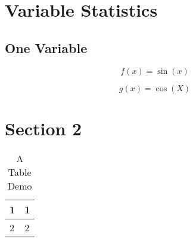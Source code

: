 \section{Variable Statistics}
\subsection{One Variable}
\begin{equation}
    f(x) = \sin(x)
\end{equation}

\begin{equation}
    g(x) = \cos(X)
\end{equation}

\section{Section 2}
\begin{table}[H]
    \centering
    \caption{A Table Demo}
    \begin{tabular}{ll}
        \hline
        1 & 1 \\
        \hline
        2 & 2 \\
        \hline
    \end{tabular}
\end{table}